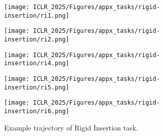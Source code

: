 \begin{figure*}[htb]
    \centering
    \begin{minipage}{0.19\textwidth}
            \centering
            \texttt{[image: ICLR\_2025/Figures/appx\_tasks/rigid-insertion/ri1.png]}
    \end{minipage}
    \begin{minipage}{0.19\textwidth}
            \centering
            \texttt{[image: ICLR\_2025/Figures/appx\_tasks/rigid-insertion/ri2.png]}
    \end{minipage}
    \begin{minipage}{0.19\textwidth}
            \centering
            \texttt{[image: ICLR\_2025/Figures/appx\_tasks/rigid-insertion/ri4.png]}
    \end{minipage}
    \begin{minipage}{0.19\textwidth}
            \centering
            \texttt{[image: ICLR\_2025/Figures/appx\_tasks/rigid-insertion/ri5.png]}
    \end{minipage}
    \begin{minipage}{0.19\textwidth}
            \centering
            \texttt{[image: ICLR\_2025/Figures/appx\_tasks/rigid-insertion/ri6.png]}
    \end{minipage}

    \caption{
    Example trajectory of Rigid Insertion task.
    }
    \label{fig:appendix_ri_vis}
\end{figure*}